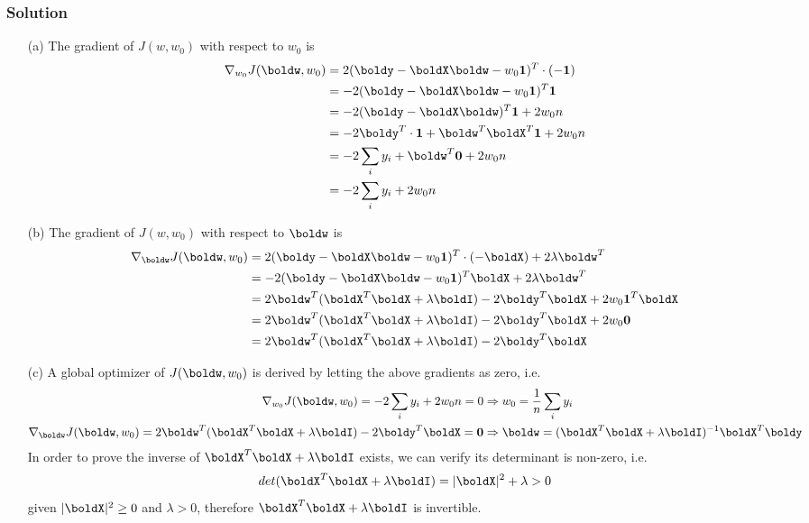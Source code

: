 \documentclass[submit]{harvardml}
\begin{document}
\subsubsection*{Solution}

\begin{itemize}
  \item[(a)] The gradient of $J(w, w_0)$ with respect to $w_0$ is 
  \begin{align*}
    \nabla_{w_0} J(\boldw, w_0) &= 2(\boldy - \boldX\boldw - w_0\bold1)^T \cdot (-\bold1) \\
    &= -2(\boldy - \boldX\boldw - w_0\bold1)^T \bold1 \\
    &= -2(\boldy - \boldX\boldw)^T\bold1 + 2w_0n \\
    &= -2\boldy^T\cdot\bold1 + \boldw^T\boldX^T\bold1 + 2w_0n  \\
    &= -2\sum_iy_i + \boldw^T \bold0 + 2w_0n \\
    &= -2\sum_iy_i + 2w_0n
  \end{align*}
  
  \item[(b)] The gradient of $J(w, w_0)$ with respect to $\boldw$ is
  \begin{align*}
    \nabla_{\boldw} J(\boldw, w_0) &= 2(\boldy - \boldX\boldw - w_0\bold1)^T \cdot (-\boldX) + 2\lambda \boldw^T \\
    &= -2(\boldy - \boldX\boldw - w_0\bold1)^T \boldX + 2\lambda \boldw^T  \\
    &= 2\boldw^T(\boldX^T\boldX + \lambda\boldI) - 2\boldy^T\boldX + 2w_0\bold1^T\boldX \\
    &= 2\boldw^T(\boldX^T\boldX + \lambda\boldI) - 2\boldy^T\boldX + 2w_0\bold0 \\
    &= 2\boldw^T(\boldX^T\boldX + \lambda\boldI) - 2\boldy^T\boldX
  \end{align*}
  
  \item[(c)] A global optimizer of $J(\boldw, w_0)$ is derived by letting the above gradients as zero, i.e.
  \begin{align*}
    \nabla_{w_0} J(\boldw, w_0) = -2\sum_iy_i + 2w_0n = 0 &\Rightarrow w_0 = \frac{1}{n} \sum_i y_i \\
    \nabla_{\boldw} J(\boldw, w_0) = 2\boldw^T(\boldX^T\boldX + \lambda\boldI) - 2\boldy^T\boldX = \bold0 &\Rightarrow 
    \boldw = (\boldX^T \boldX + \lambda \boldI)^{-1} \boldX^T \boldy
  \end{align*}
  In order to prove the inverse of $\boldX^T \boldX + \lambda \boldI$ exists, we can verify its determinant is non-zero, i.e.
  $$ det(\boldX^T\boldX + \lambda\boldI) = |\boldX|^2 + \lambda > 0 $$ 
  given $|\boldX|^2 \ge 0$ and $\lambda > 0$, therefore $\boldX^T \boldX + \lambda \boldI$ is invertible.
\end{itemize}
\end{document}

